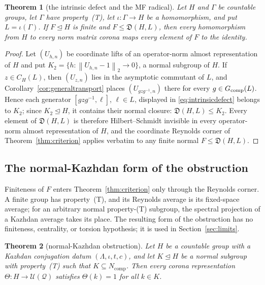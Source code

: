 \documentclass[11pt]{amsart}
\newcommand{\leanverified}[2]{\ignorespaces}
\newtheorem{theorem}{Theorem}[section]
\theoremstyle{definition}
\theoremstyle{remark}
\theoremstyle{plain}
\newcommand{\U}{\mathcal U}
\newcommand{\hsnorm}[1]{\left\lVert #1\right\rVert_{2}}
\begin{document}
\begin{theorem}[the intrinsic defect and the MF radical]
\label{thm:compression-radical}
Let $H$ and $\Gamma$ be countable groups, let $\Gamma$ have
property~\textup{(T)}, let
$\iota\colon\Gamma\to H$ be a homomorphism, and put
$L=\iota(\Gamma)$.  If $F\trianglelefteq H$ is finite and
$F\le\mathfrak D(H,L)$, then every homomorphism from $H$ to every norm
matrix corona maps every element of $F$ to the identity.
\leanverified{Sofic/ManuscriptKazhdanTransport}{GroupApproximation.KazhdanAsymptoticCommutant.manuscriptCompressionRadical}
\end{theorem}

\begin{proof}
Let $(U_{h,n})$ be coordinate lifts of an operator-norm almost
representation of $H$ and put
$K_2=\{h:\hsnorm{U_{h,n}-1}\to0\}$, a normal subgroup of $H$.
If $z\in C_H(L)$, then $(U_{z,n})$ lies in the asymptotic commutant of
$L$, and Corollary~\ref{cor:generaltransport} places
$(U_{gzg^{-1},n})$ there for every $g\in G_{\rm comp}(L)$.  Hence each
generator $[gzg^{-1},\ell]$, $\ell\in L$, displayed in
\eqref{eq:intrinsicdefect} belongs to $K_2$; since
$K_2\trianglelefteq H$, it contains their normal closure:
$\mathfrak D(H,L)\le K_2$.  Every element of $\mathfrak D(H,L)$ is
therefore Hilbert--Schmidt invisible in every operator-norm almost
representation of $H$, and the coordinate Reynolds corner of
Theorem~\ref{thm:criterion} applies verbatim to any finite normal
$F\le\mathfrak D(H,L)$.
\end{proof}

\subsection{The normal-Kazhdan form of the obstruction}

Finiteness of $F$ enters Theorem~\ref{thm:criterion} only through the
Reynolds corner.  A finite group has property~\textup{(T)}, and its
Reynolds average is its fixed-space average; for an arbitrary normal
property-\textup{(T)} subgroup, the spectral projection of a Kazhdan
average takes its place.  The resulting form of the obstruction has no
finiteness, centrality, or torsion hypothesis; it is used in
Section~\ref{sec:limits}.

\begin{theorem}[normal-Kazhdan obstruction]\label{thm:normal-kazhdan}
Let $H$ be a countable group with a Kazhdan conjugation datum
$(\Lambda,\iota,t,c)$, and let $K\trianglelefteq H$ be a normal
subgroup with property~\textup{(T)} such that
$K\subseteq N_{\mathrm{comp}}$.  Then every corona representation
$\Theta\colon H\to\U(\mathcal Q)$ satisfies $\Theta(k)=1$ for all
$k\in K$.
\leanverified{Sofic/ManuscriptExactWrappers}{GroupApproximation.ManuscriptExactWrappers.manuscriptNormalKazhdanObstruction}
\end{theorem}
\end{document}
